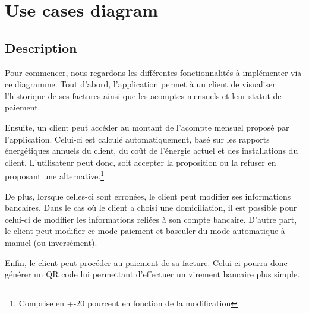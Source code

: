 \section{Use cases diagram}
\subsection{Description}
\begin{flushleft}
Pour commencer, nous regardons les différentes fonctionnalités à implémenter via ce diagramme. Tout d'abord, l'application permet à un client de visualiser l'historique de ses factures ainsi que les acomptes mensuels et leur statut de paiement.
\end{flushleft}

\begin{flushleft}
Ensuite, un client peut accéder au montant de l'acompte mensuel proposé par l'application. Celui-ci est calculé automatiquement, basé sur les rapports énergétiques annuels du client, du coût de l'énergie actuel et des installations du client. L'utilisateur peut donc, soit accepter la proposition ou la refuser en proposant une alternative.\footnote{Comprise en +-20 pourcent en fonction de la modification}
\end{flushleft}

\begin{flushleft}
De plus, lorsque celles-ci sont erronées, le client peut modifier ses informations bancaires. Dans le cas où le client a choisi une domiciliation, il est possible pour celui-ci de modifier les informations reliées à son compte bancaire.
D'autre part, le client peut modifier ce mode paiement et basculer du mode automatique à manuel (ou inversément).
\end{flushleft}

\begin{flushleft}
Enfin, le client peut procéder au paiement de sa facture. Celui-ci pourra donc générer un QR code lui permettant d'effectuer un virement bancaire plus simple.
\end{flushleft}

